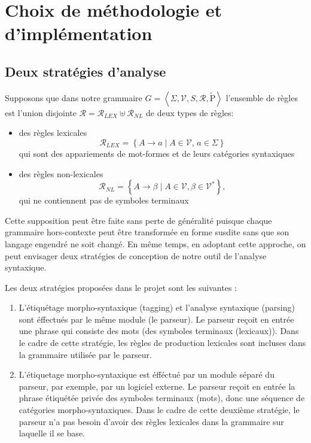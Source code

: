 \documentclass[12pt]{article}
\begin{document}
\section{Choix de m\'ethodologie et d'impl\'ementation}

\subsection{Deux strat\'egies d'analyse}

Supposons que dans notre grammaire $G = \left< \Sigma, \mathscr{V}, S, \mathscr{R}, \tilde{\mathrm{P}} \right>$ l'ensemble de r\`egles est l'union disjointe $\mathscr{R} = \mathscr{R}_{LEX} \uplus \mathscr{R}_{NL}$ de deux types de r\`egles:
\begin{itemize}
\item des règles lexicales
$$\mathscr{R}_{LEX} = \left\{ A \rightarrow a \mid
        A \in \mathscr{V}, \, a \in \Sigma \right\}$$
qui sont des appariements de mot-formes et de leurs catégories syntaxiques
\item des règles non-lexicales
$$\mathscr{R}_{NL} = \left\{ A \rightarrow \beta \mid
     A \in \mathscr{V}, \beta \in \mathscr{V}^* \right\},$$
qui ne contiennent pas de symboles terminaux
\end{itemize}

Cette supposition peut \^etre faite sans perte de g\'en\'eralit\'e puisque
chaque grammaire hors-contexte peut \^etre transform\'ee en forme susdite sans
que son langage engendr\'e ne soit chang\'e. En m\^eme temps, en adoptant cette
approche, on peut envisager deux strat\'egies de conception de notre outil de
l'analyse syntaxique.

Les deux stratégies proposées dans le projet sont les suivantes :
\begin{enumerate}
  \item L'étiquétage morpho-syntaxique (tagging) et l'analyse syntaxique
  (parsing) sont éffectués par le même module (le parseur). Le
  parseur reçoit en entrée une phrase qui consiste des mots (des symboles terminaux (lexicaux)).
  Dans le cadre de cette stratégie, les règles de production lexicales sont
  incluses dans la grammaire utilisée par le parseur.
  \item L'étiquetage morpho-syntaxique est éfféctué par un module séparé du
  parseur, par exemple, par un logiciel externe. Le parseur reçoit en entrée la
  phrase étiquétée privée des symboles terminaux (mots), donc une séquence de
  catégories morpho-syntaxiques. Dans le cadre de cette deuxième stratégie, le
  parseur n'a pas besoin d'avoir des règles lexicales dans la grammaire sur
  laquelle il se base.
\end{enumerate}
\end{document}
